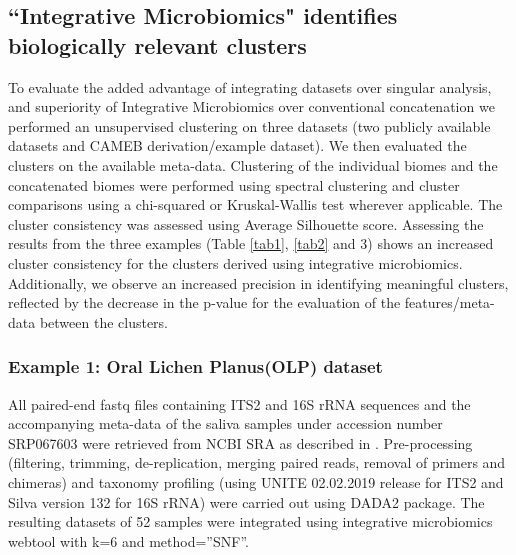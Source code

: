 \subsection{``Integrative Microbiomics" identifies biologically relevant clusters}

To evaluate the added advantage of integrating datasets over singular analysis, and superiority of Integrative Microbiomics over conventional concatenation we performed an unsupervised clustering on three datasets (two publicly available datasets and CAMEB derivation/example dataset). We then evaluated the clusters on the available meta-data. Clustering of the individual biomes and the concatenated biomes were performed using spectral clustering and cluster comparisons using a chi-squared or Kruskal-Wallis test wherever applicable. The cluster consistency was assessed using Average Silhouette score. Assessing the results from the three examples (Table \ref{tab1}, \ref{tab2} and 3) shows an increased cluster consistency for the clusters derived using integrative microbiomics. Additionally, we observe an increased precision in identifying meaningful clusters, reflected by the decrease in the p-value for the evaluation of the features/meta-data between the clusters.\\

\subsubsection{Example 1: Oral Lichen Planus(OLP) dataset}
All paired-end fastq files containing ITS2 and 16S rRNA sequences and the accompanying meta-data of the saliva samples under accession number SRP067603 were retrieved from NCBI SRA as described in \cite{Li2019}. Pre-processing (filtering, trimming, de-replication, merging paired reads, removal of primers and chimeras) and taxonomy profiling (using UNITE 02.02.2019 release for ITS2 and Silva version 132 for 16S rRNA) were carried out using DADA2 package. The resulting datasets of 52 samples were integrated using integrative microbiomics webtool with k=6 and method=”SNF”.\\

